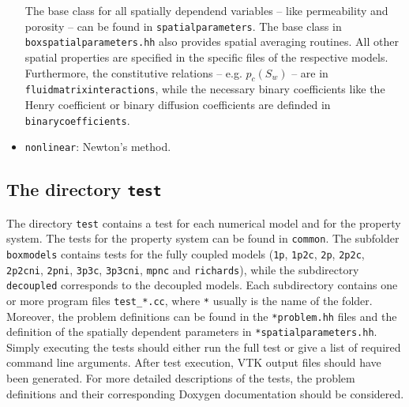 \begin{itemize}
The base class for all spatially dependend variables -- like permeability and porosity  -- 
can be found in \texttt{spatialparameters}. The base class in \texttt{boxspatialparameters.hh} 
also provides spatial averaging routines. All other spatial properties are specified in the specific
 files of the respective models. Furthermore, the constitutive relations -- e.g. $p_c(S_w) $ -- are in \texttt{fluidmatrixinteractions}, 
while the necessary binary coefficients like the Henry coefficient or binary diffusion coefficients are definded in
 \texttt{binarycoefficients}.


\item \texttt{nonlinear}: Newton's method.


% 
% 
% 
% 
% 
% 
% 
% 


\end{itemize}



\subsection{The directory \texttt{test}}\label{sec:test}


The directory \texttt{test} contains a test for each numerical model and for 
the property system. The tests for the property system can be found in \texttt{common}. 
The subfolder \texttt{boxmodels} contains tests for the fully 
coupled models (\texttt{1p},  \texttt{1p2c},  \texttt{2p},  \texttt{2p2c},  
\texttt{2p2cni},  \texttt{2pni}, \texttt{3p3c},  \texttt{3p3cni},  \texttt{mpnc} and \texttt{richards}), while the subdirectory \texttt{decoupled} corresponds to the decoupled models. 
Each subdirectory contains one or more program files \texttt{test\_*.cc}, where \texttt{*} usually is the 
name of the folder. Moreover, the problem definitions can be found 
in the \texttt{*problem.hh} files and the definition of the spatially dependent parameters in \texttt{*spatialparameters.hh}. Simply executing the tests should either run the 
full test or give a list of required command line arguments. After test execution, 
VTK output files should have been generated. 
For more detailed descriptions of the tests, the problem definitions and their corresponding 
Doxygen documentation should be considered. 

